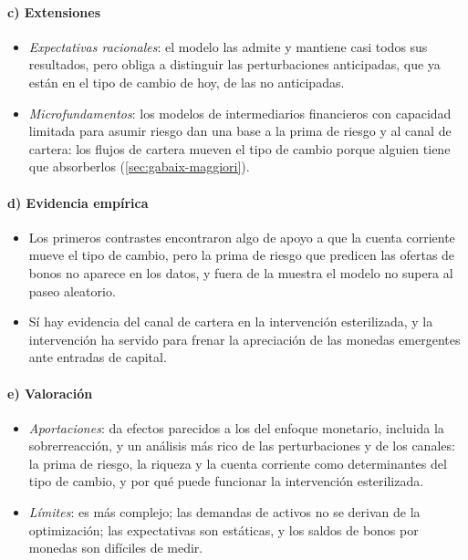 \documentclass[11pt]{article}
\begin{document}
\paragraph{c) Extensiones}
\begin{itemize}
\item \emph{Expectativas racionales}: el modelo las admite y mantiene casi todos sus resultados, pero obliga a distinguir las perturbaciones anticipadas, que ya están en el tipo de cambio de hoy, de las no anticipadas.
\item \emph{Microfundamentos}: los modelos de intermediarios financieros con capacidad limitada para asumir riesgo dan una base a la prima de riesgo y al canal de cartera: los flujos de cartera mueven el tipo de cambio porque alguien tiene que absorberlos\nocite{GabaixMaggiori2015} (\ref{sec:gabaix-maggiori}).
\end{itemize}

\paragraph{d) Evidencia empírica}
\begin{itemize}
\item Los primeros contrastes encontraron algo de apoyo a que la cuenta corriente mueve el tipo de cambio\nocite{BransonHalttunenMasson1977}, pero la prima de riesgo que predicen las ofertas de bonos no aparece en los datos\nocite{Frankel1982Search}, y fuera de la muestra el modelo no supera al paseo aleatorio.
\item Sí hay evidencia del canal de cartera en la intervención esterilizada\nocite{DominguezFrankel1993Does}, y la intervención ha servido para frenar la apreciación de las monedas emergentes ante entradas de capital\nocite{BlanchardAdlerCarvalho2015Can}.
\end{itemize}

\paragraph{e) Valoración}
\begin{itemize}
\item \emph{Aportaciones}: da efectos parecidos a los del enfoque monetario, incluida la sobrerreacción, y un análisis más rico de las perturbaciones y de los canales: la prima de riesgo, la riqueza y la cuenta corriente como determinantes del tipo de cambio, y por qué puede funcionar la intervención esterilizada.
\item \emph{Límites}: es más complejo; las demandas de activos no se derivan de la optimización; las expectativas son estáticas, y los saldos de bonos por monedas son difíciles de medir.
\end{itemize}
\end{document}
